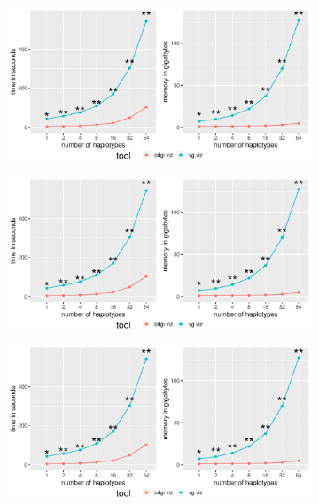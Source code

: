 \begin{figure}[!htb]
	\centering
	\begin{subfigure}[t]{0.4\textwidth}
		\centering
		\caption{}
		\includegraphics[width=\linewidth]{fig/performance/TODO_by_haps_eval_time_ram.pdf}
		\label{fig:haps_time_ram}
	\end{subfigure}
	\begin{subfigure}[t]{0.4\textwidth}
		\centering
		\caption{}
		\includegraphics[width=\linewidth]{fig/performance/TODO_by_threads_eval_time_ram.pdf}
		\label{fig:threads_time_ram}
	\end{subfigure}
	\begin{subfigure}[t]{0.4\textwidth}
		\centering
		\caption{}
		\includegraphics[width=\linewidth]{fig/performance/TODO_1d_alibi_time_ram.pdf}

\end{subfigure}
\end{figure}
